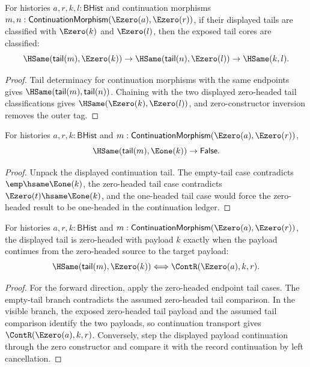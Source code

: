 \begin{theorem}
\label{thm:continuation-morphism-e0-source-e0-target-tail-core-deterministic}
For histories $a,r,k,l:\mathsf{BHist}$ and continuation morphisms
$m,n:\mathsf{ContinuationMorphism}(\Ezero(a),\Ezero(r))$, if their displayed
tails are classified with $\Ezero(k)$ and $\Ezero(l)$, then the exposed tail
cores are classified:
$$
\HSame(\mathsf{tail}(m),\Ezero(k))
\to
\HSame(\mathsf{tail}(n),\Ezero(l))
\to
\HSame(k,l).
$$
\end{theorem}
\begin{proof}
Tail determinacy for continuation morphisms with the same endpoints gives
$\HSame(\mathsf{tail}(m),\mathsf{tail}(n))$. Chaining with the two displayed
zero-headed tail classifications gives
$\HSame(\Ezero(k),\Ezero(l))$, and zero-constructor inversion removes the
outer tag.
\end{proof}

\begin{proposition}
\label{prop:category-continuation-e0-e0-tail-e1-absurd}
For histories $a,r,k:\mathsf{BHist}$ and
$m:\mathsf{ContinuationMorphism}(\Ezero(a),\Ezero(r))$,
$$
\HSame(\mathsf{tail}(m),\Eone(k))\to\mathsf{False}.
$$
\end{proposition}
\begin{proof}
Unpack the displayed continuation tail. The empty-tail case contradicts
$\emp\hsame\Eone(k)$, the zero-headed tail case contradicts
$\Ezero(t)\hsame\Eone(k)$, and the one-headed tail case would force the
zero-headed result to be one-headed in the continuation ledger.
\end{proof}

\begin{theorem}
\label{thm:continuation-morphism-e0-source-e0-target-tail-e0-iff}
For histories $a,r,k:\mathsf{BHist}$ and
$m:\mathsf{ContinuationMorphism}(\Ezero(a),\Ezero(r))$, the displayed tail is
zero-headed with payload $k$ exactly when the payload continues from the
zero-headed source to the target payload:
$$
\HSame(\mathsf{tail}(m),\Ezero(k))
\Longleftrightarrow
\ContR(\Ezero(a),k,r).
$$
\end{theorem}
\begin{proof}
For the forward direction, apply the zero-headed endpoint tail cases. The
empty-tail branch contradicts the assumed zero-headed tail comparison. In the
visible branch, the exposed zero-headed tail payload and the assumed tail
comparison identify the two payloads, so continuation transport gives
$\ContR(\Ezero(a),k,r)$. Conversely, step the displayed payload continuation
through the zero constructor and compare it with the record continuation by
left cancellation.
\end{proof}

